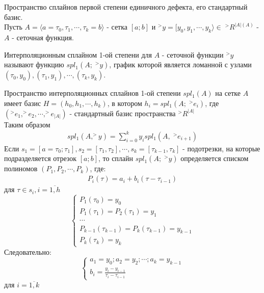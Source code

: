 \documentclass[__main__.tex]{subfiles}
\begin{document}
Пространство сплайнов первой степени единичного дефекта, его стандартный базис.\\

Пусть $A = \langle a=\tau_0,\tau_1,\cdots,\tau_k = b \rangle$ - сетка $[a;b]$ и $^>y = [y_0, y_1, \cdots, y_k \rangle \in\;^>R^{|A|(A)}$ - $A$ - сеточная функция.
\begin{definition}
    Интерполяционным сплайном 1-ой степени для $A$ - сеточной функции $^>y$ называют функцию $spl_1\left(A;\;^>y\right)$, график которой является ломанной с узлами $(\tau_0, y_0),(\tau_1, y_1),\cdots, (\tau_k, y_k)$.
\end{definition}
Пространство интерполяционных сплайнов 1-ой степени $spl_1(A)$ на сетке $A$ имеет базис $H = \left(h_0,h_1,\cdots,h_k\right)$, в котором $h_i = spl_1\left(A;\;^>e_i\right)$, где $\left(^>e_1, ^>e_2,\cdots, ^>e_{|A|}\right)$ - стандартный базис пространства $^>R^{|A|}$\\
Таким образом
\begin{gather*}
    spl_1\left(A,^>y\right) = \sum_{i=0}^{k}y_ispl_1\left(A,\;^>e_{i+1}\right)
\end{gather*}
Если $s_1 = [a=\tau_0;\tau_1], s_2=[\tau_1,\tau_2],\cdots, s_k=[\tau_{k-1},\tau_{k}]$ - подотрезки, на которые подразделяется отрезок $[a;b]$, то сплайн $spl_1\left(A;\; ^>y\right)$ определяется списком полиномов $\left(P_1,P_2,\cdots, P_k\right)$, где:
\begin{gather*}
    P_i(\tau) = a_i+b_i(\tau-\tau_{i-1})
\end{gather*}
для $\tau \in s_i, i=\overline{1,h}$
\begin{equation*}
    \begin{cases}
        P_1(\tau_0) = y_0                               \\
        P_1(\tau_1) = P_2(\tau_1) = y_1                 \\
        \cdots                                          \\
        P_{k-1}(\tau_{k-1}) = P_k(\tau_{k-1}) = y_{k-1} \\
        P_k(\tau_{k}) = y_k
    \end{cases}
\end{equation*}
Следовательно:
\begin{equation*}
    \begin{cases}
        a_1 = y_0; a_2 = y_2; \cdots; a_k = y_{k-1} \\
        b_i = \frac{y_i-y_{i-1}}{\tau_i - \tau_{i-1}}
    \end{cases}
\end{equation*}
для $ i = \overline{1,k}$
\end{document}
